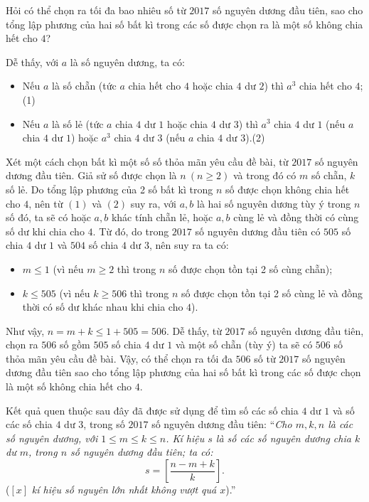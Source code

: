 \begin{bt}%
	Hỏi có thể chọn ra tối đa bao nhiêu số từ $ 2017 $ số nguyên dương đầu tiên, sao cho tổng lập phương của hai số bất kì trong các số được chọn ra là một số không chia hết cho $ 4 $?
	\loigiai
	{Dễ thấy, với $ a $ là số nguyên dương, ta có:
\begin{itemize}
	\item Nếu $ a $ là số chẵn (tức $ a $ chia hết cho $ 4 $ hoặc chia $ 4 $ dư $ 2 $) thì $ a^3 $ chia hết cho $ 4 $;\hfill (1)
	\item Nếu $ a $ là số lẻ (tức $ a $ chia $ 4 $ dư $ 1 $ hoặc chia $ 4 $ dư $ 3 $) thì $ a^3 $ chia $ 4 $ dư $ 1 $ (nếu $ a $ chia $ 4 $ dư $ 1 $) hoặc $ a^3 $ chia $ 4 $ dư $ 3 $ (nếu $ a $ chia $ 4 $ dư $ 3 $).\hfill (2)
\end{itemize}	
		Xét một cách chọn bất kì một số số thỏa mãn yêu cầu đề bài, từ $ 2017 $ số nguyên dương đầu tiên. Giả sử số được chọn là $ n\ (n\geq 2) $ và trong đó có $ m $ số chẵn, $ k $ số lẻ.
		Do tổng lập phương của 2 số bất kì trong $ n $ số được chọn không chia hết cho $ 4 $, nên từ $ (1) $ và $ (2) $ suy ra, với $ a, b $ là hai số nguyên dương tùy ý trong $ n $ số đó, ta sẽ có hoặc $ a, b $ khác tính chẵn lẻ, hoặc $ a, b $ cùng lẻ và đồng thời có cùng số dư khi chia cho $ 4 $. Từ đó, do trong $ 2017 $ số nguyên dương đầu tiên có $ 505 $ số chia $ 4 $ dư $ 1 $ và $ 504 $ số chia $ 4 $ dư $ 3 $, nên suy ra ta có:
\begin{itemize}
	\item $ m\leq 1 $ (vì nếu $ m\geq 2 $ thì trong $ n $ số được chọn tồn tại 2 số cùng chẵn);
\item $ k\leq 505 $ (vì nếu $ k\geq 506 $ thì trong $ n $ số được chọn tồn tại 2 số cùng lẻ và đồng thời có số dư khác nhau khi chia cho $ 4 $).
\end{itemize}	
		Như vậy, $ n=m+k\leq  1+505=506$.
		Dễ thấy, từ $ 2017 $ số nguyên dương đầu tiên, chọn ra $ 506 $ số gồm $ 505 $ số chia $ 4 $ dư $ 1 $ và một số chẵn (tùy ý) ta sẽ có $ 506 $ số thỏa mãn yêu cầu đề bài.
		Vậy, có thể chọn ra tối đa $ 506 $ số  từ $ 2017 $ số nguyên dương đầu tiên sao cho tổng lập phương của hai số bất kì trong các số được chọn là một số không chia hết cho $ 4 $. 
\begin{nx}
		Kết quả quen thuộc sau đây đã được sử dụng để tìm số các số chia $ 4 $ dư $ 1 $ và số các số chia $ 4 $ dư $ 3 $, trong số $ 2017 $ số nguyên dương đầu tiên: ``{\it Cho $ m, k, n $ là các số nguyên dương, với $ 1\leq m\leq k\leq n $. Kí hiệu $ s $ là số các số nguyên dương  chia $ k $ dư $ m $, trong $ n $ số nguyên dương đầu tiên; ta có:} $$ s=
		\left[ \dfrac{n-m+k}{k} \right]. $$
		($ \left[x\right] $ {\it kí hiệu số nguyên lớn nhất không vượt quá $ x $}).'' 
	\end{nx}
}
\end{bt}

